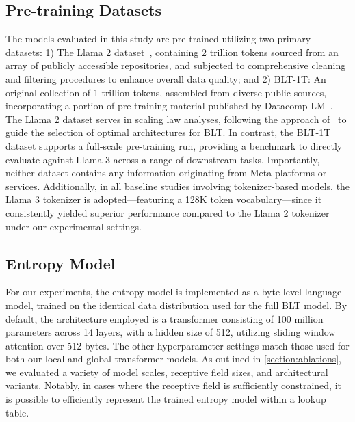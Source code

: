 \subsection{Pre-training Datasets} The models evaluated in this study are pre-trained utilizing two primary datasets: 1) The Llama 2 dataset~\citep{touvron2023llama}, containing 2 trillion tokens sourced from an array of publicly accessible repositories, and subjected to comprehensive cleaning and filtering procedures to enhance overall data quality; and 2) {\textsc BLT}-1T: An original collection of 1 trillion tokens, assembled from diverse public sources, incorporating a portion of pre-training material published by Datacomp-LM~\citep{li2024datacomp}. The Llama 2 dataset serves in scaling law analyses, following the approach of~\cite{dubey2024llama} to guide the selection of optimal architectures for {\textsc BLT}. In contrast, the {\textsc BLT}-1T dataset supports a full-scale pre-training run, providing a benchmark to directly evaluate against Llama 3 across a range of downstream tasks. Importantly, neither dataset contains any information originating from Meta platforms or services. Additionally, in all baseline studies involving tokenizer-based models, the Llama 3 tokenizer is adopted—featuring a 128K token vocabulary—since it consistently yielded superior performance compared to the Llama 2 tokenizer under our experimental settings.

\subsection{Entropy Model} For our experiments, the entropy model is implemented as a byte-level language model, trained on the identical data distribution used for the full {\textsc BLT} model. By default, the architecture employed is a transformer consisting of 100 million parameters across 14 layers, with a hidden size of 512, utilizing sliding window attention over 512 bytes. The other hyperparameter settings match those used for both our local and global transformer models. As outlined in \autoref{section:ablations}, we evaluated a variety of model scales, receptive field sizes, and architectural variants. Notably, in cases where the receptive field is sufficiently constrained, it is possible to efficiently represent the trained entropy model within a lookup table.

